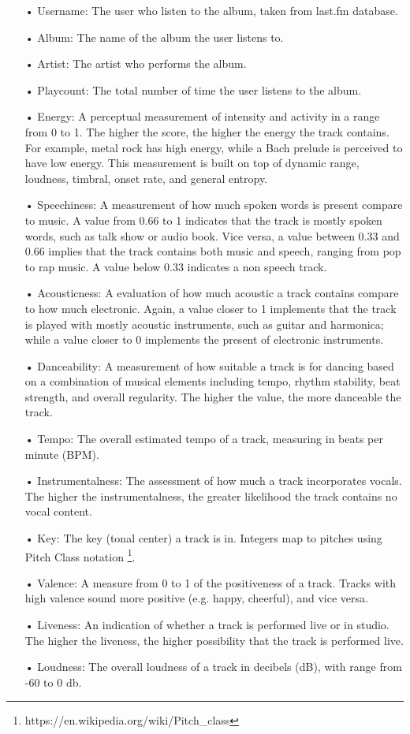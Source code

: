 \begin{itemize}
\item[•] Username: The user who listen to the album, taken from last.fm database.
\item[•] Album: The name of the album the user listens to.
\item[•] Artist: The artist who performs the album.
\item[•] Playcount: The total number of time the user listens to the album.
\item[•] Energy: A perceptual measurement of intensity and activity in a range from 0 to 1. The higher the score, the higher the energy the track contains. For example, metal rock has high energy, while a Bach prelude is perceived to have low energy. This measurement is built on top of dynamic range, loudness, timbral, onset rate, and general entropy.
\item[•] Speechiness: A measurement of how much spoken words is present compare to music. A value from 0.66 to 1 indicates that the track is mostly spoken words, such as talk show or audio book. Vice versa, a value between 0.33 and 0.66 implies that the track contains both music and speech, ranging from pop to rap music. A value below 0.33 indicates a non speech track. 
\item[•] Acousticness: A evaluation of how much acoustic a track contains compare to how much electronic. Again, a value closer to 1 implements that the track is played with mostly acoustic instruments, such as guitar and harmonica; while a value closer to 0 implements the present of electronic instruments.
\item[•] Danceability: A measurement of how suitable a track is for dancing based on a combination of musical elements including tempo, rhythm stability,  beat strength, and overall regularity. The higher the value, the more danceable the track.
\item[•] Tempo: The overall estimated tempo of a track, measuring in beats per minute (BPM).
\item[•] Instrumentalness: The assessment of how much a track incorporates vocals. The higher the instrumentalness, the greater likelihood the track contains no vocal content. 
\item[•] Key: The key (tonal center) a track is in. Integers map to pitches using Pitch Class notation \footnote{https://en.wikipedia.org/wiki/Pitch\_class}. 
\item[•] Valence: A measure from 0 to 1 of the positiveness of a track. Tracks with high valence sound more positive (e.g. happy, cheerful), and vice versa.
\item[•] Liveness: An indication of whether a track is performed live or in studio. The higher the liveness, the higher possibility that the track is performed live.
\item[•] Loudness: The overall loudness of a track in decibels (dB), with range from -60 to 0 db. 
\end{itemize}

